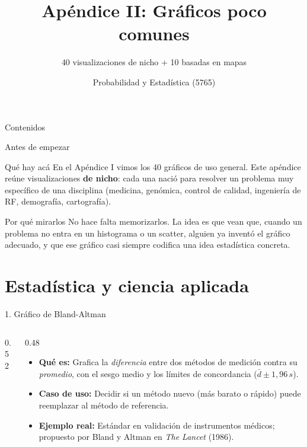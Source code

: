 \documentclass[aspectratio=169,9pt]{beamer}
\title[Prob. y Estadística]{Apéndice II: Gráficos poco comunes}
\subtitle{40 visualizaciones de nicho + 10 basadas en mapas}
\institute[UNS]{Universidad Nacional del Sur \\ Departamento de Matemática}
\author{Probabilidad y Estadística (5765)}
\date{}
\newcommand{\ficha}[3]{%
\begin{itemize}
\item \textbf{Qué es:} #1
\item \textbf{Caso de uso:} #2
\item \textbf{Ejemplo real:} #3
\end{itemize}}
\begin{document}
\begin{frame}
\titlepage
\end{frame}

\begin{frame}{Contenidos}
\tableofcontents
\end{frame}

\begin{frame}{Antes de empezar}
\begin{block}{Qué hay acá}
En el Apéndice I vimos los 40 gráficos de uso general. Este apéndice reúne visualizaciones \textbf{de nicho}: cada una nació para resolver un problema muy específico de una disciplina (medicina, genómica, control de calidad, ingeniería de RF, demografía, cartografía).
\end{block}
\begin{alertblock}{Por qué mirarlos}
No hace falta memorizarlos. La idea es que vean que, cuando un problema no entra en un histograma o un scatter, alguien ya inventó el gráfico adecuado, y que ese gráfico casi siempre codifica una idea estadística concreta.
\end{alertblock}
\end{frame}

\section{Estadística y ciencia aplicada}

\begin{frame}{1. Gráfico de Bland-Altman}
\begin{columns}[T]
\begin{column}{0.52\textwidth}
\centering
{}
\end{column}
\begin{column}{0.48\textwidth}
\ficha{Grafica la \emph{diferencia} entre dos métodos de medición contra su \emph{promedio}, con el sesgo medio y los límites de concordancia ($\bar{d}\pm 1{,}96\,s$).}
{Decidir si un método nuevo (más barato o rápido) puede reemplazar al método de referencia.}
{Estándar en validación de instrumentos médicos; propuesto por Bland y Altman en \emph{The Lancet} (1986).}
\end{column}
\end{columns}
\end{frame}
\end{document}
